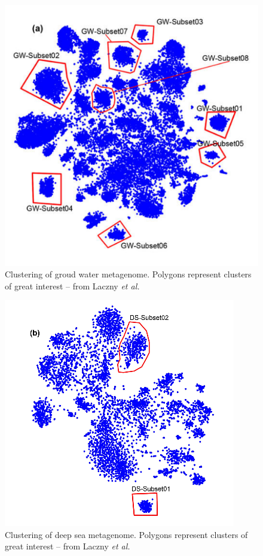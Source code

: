 \documentclass[twocolumn]{bmcart}%
\begin{document}
	\begin{figure}
		\includegraphics[width=.9\linewidth]{bilder/groudwaterCluster.png}
		\caption{Clustering of groud water metagenome. Polygons represent clusters of great interest -- from Laczny \textit{et al.}\cite{Laczny2014}}
		\label{img:groudwater}
	\end{figure}
\begin{figure}[h!]
		\centering
	\includegraphics[width=.9\linewidth]{bilder/marineCluster.png}
	\caption{Clustering of deep sea metagenome. Polygons represent clusters of great interest -- from Laczny \textit{et al.}\cite{Laczny2014}}
	\label{img:deepsea}
\end{figure}
\end{document}
